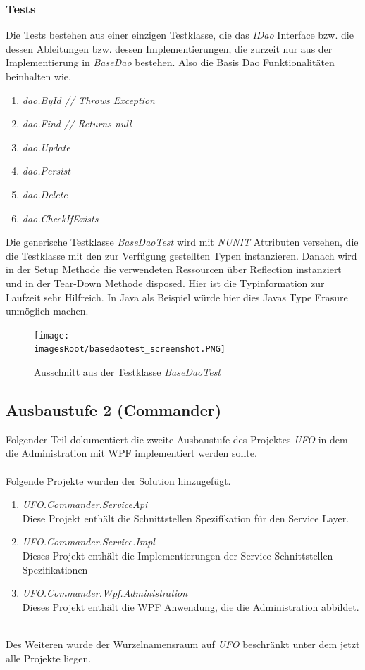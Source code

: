 \documentclass[11pt, a4paper, twoside]{article}   	%
\newcommand{\imagesRoot}{images}
\begin{document}
\subsubsection{Tests}
Die Tests bestehen aus einer einzigen Testklasse, die das \emph{IDao} Interface bzw. die dessen Ableitungen bzw. dessen Implementierungen, die zurzeit nur aus der Implementierung in \emph{BaseDao} bestehen. Also die Basis Dao Funktionalitäten beinhalten wie.\\
\begin{enumerate}
	\item\emph{dao.ById // Throws Exception}
	\item\emph{dao.Find // Returns null}
	\item\emph{dao.Update}
	\item\emph{dao.Persist}
	\item\emph{dao.Delete}
	\item\emph{dao.CheckIfExists}
\end{enumerate}
Die generische Testklasse \emph{BaseDaoTest}  wird mit \emph{NUNIT} Attributen versehen, die die Testklasse mit den zur Verfügung gestellten Typen instanzieren. Danach wird in der Setup Methode die verwendeten Ressourcen über Reflection instanziert und in der Tear-Down Methode disposed. Hier ist die Typinformation zur Laufzeit sehr Hilfreich. In Java als Beispiel würde hier dies Javas Type Erasure unmöglich machen.
\begin{figure}[h]
	\centering
	\texttt{[image: \\imagesRoot/basedaotest\_screenshot.PNG]}
	\caption
	{Ausschnitt aus der Testklasse \emph{BaseDaoTest}}
\end{figure}

\subsection{Ausbaustufe 2 (Commander)}
Folgender Teil dokumentiert die zweite Ausbaustufe des Projektes \emph{UFO} in dem die Administration mit WPF implementiert werden sollte.\\\\
Folgende Projekte wurden der Solution hinzugefügt.
\begin{enumerate}
	\item\emph{UFO.Commander.ServiceApi}\\
	Diese Projekt enthält die Schnittstellen Spezifikation für den Service Layer.
	\item\emph{UFO.Commander.Service.Impl}\\
	Dieses Projekt enthält die Implementierungen der Service Schnittstellen Spezifikationen
	\item\emph{UFO.Commander.Wpf.Administration}\\
	Dieses Projekt enthält die WPF Anwendung, die die Administration abbildet.
\end{enumerate}
\ \\
Des Weiteren wurde der Wurzelnamensraum auf \emph{UFO} beschränkt unter dem jetzt alle Projekte liegen.
\end{document}
